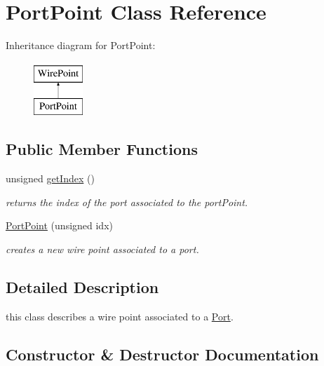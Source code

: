 \hypertarget{class_open_chams_1_1_port_point}{}\section{Port\+Point Class Reference}
\label{class_open_chams_1_1_port_point}
Inheritance diagram for Port\+Point\+:\begin{figure}[H]
\begin{center}
\leavevmode
\includegraphics[height=2.000000cm]{class_open_chams_1_1_port_point}
\end{center}
\end{figure}
\subsection*{Public Member Functions}
\begin{DoxyCompactItemize}
\item 
\mbox{\label{class_open_chams_1_1_port_point_ab4018980dcd1fed5208e7a72846cd815}} 
unsigned \mbox{\hyperlink{class_open_chams_1_1_port_point_ab4018980dcd1fed5208e7a72846cd815}{get\+Index}} ()
\begin{DoxyCompactList}\small\item\em returns the index of the port associated to the port\+Point. \end{DoxyCompactList}\item 
\mbox{\hyperlink{class_open_chams_1_1_port_point_aaa11e5ede2581539ec666941e1c86fc3}{Port\+Point}} (unsigned idx)
\begin{DoxyCompactList}\small\item\em creates a new wire point associated to a port. \end{DoxyCompactList}\end{DoxyCompactItemize}


\subsection{Detailed Description}
this class describes a wire point associated to a \mbox{\hyperlink{class_open_chams_1_1_port}{Port}}. 

\subsection{Constructor \& Destructor Documentation}
\mbox{\label{class_open_chams_1_1_port_point_aaa11e5ede2581539ec666941e1c86fc3}} 
